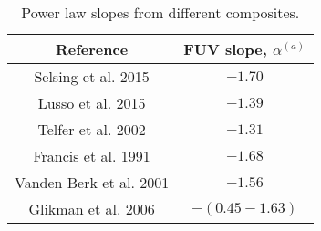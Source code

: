 \begin{table}
\centering
\begin{center}
\caption{Power law slopes from different composites.}
\begin{tabular}{cc}
\hline
\noalign{\smallskip}
Reference &  FUV slope, $\alpha$$^{(a)}$ \\  
\hline


Selsing et al. 2015  & $-1.70$   \\
Lusso et al. 2015  & $-1.39$   \\
Telfer et al. 2002  & $-1.31$   \\
Francis et al. 1991  & $-1.68 $   \\

Vanden Berk et al. 2001  & $-1.56$   \\
Glikman et al. 2006 & $-(0.45 - 1.63)$   \\
\hline
\hline
\end{tabular}
\end{center}


\end{table}



